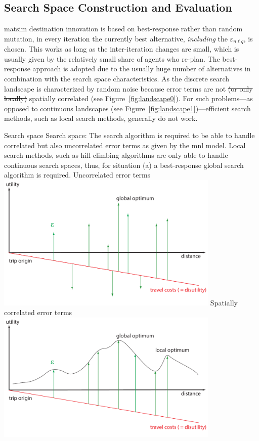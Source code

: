 \subsection{Search Space Construction and Evaluation}
\gls{matsim} destination innovation is based on best-response rather than random mutation, \ie in every iteration the currently best alternative, \emph{including} the $\varepsilon_{n \ell q}$, is chosen. 
This works as long as the inter-iteration changes are small, which is usually given by the relatively small share of agents who re-plan. 
The best-response approach is adopted due to the usually huge number of alternatives in combination with the search space characteristics. 
As the discrete search landscape is characterized by random noise because error terms are not \st{(or only locally)} spatially correlated (see Figure~\ref{fig:landscape0}). For such problems---as opposed to continuous landscapes (see Figure~\ref{fig:landscape1})---efficient search methods, such as local search methods, generally do not work.

\createfigure%
{Search space}%
{Search space: The search algorithm is required to be able to handle correlated but also uncorrelated error terms as given by the \gls{mnl} model. Local search methods, such as hill-climbing algorithms are only able to handle continuous search spaces, thus, for situation (a) a best-response global search algorithm is required.}%
{\label{fig:landscape}}%
{%
  \createsubfigure%
  {Uncorrelated error terms}%
  {\includegraphics[width=0.8\textwidth,angle=0]{extending/figures/dc/landscape1.pdf}}%
  {\label{fig:landscape0}}%
  {}%
  \createsubfigure%
  {Spatially correlated error terms}%
	{\includegraphics[width=0.8\textwidth,angle=0]{extending/figures/dc/landscape0.pdf}}%
  {\label{fig:landscape1}}%
  {}%
}%
{}

